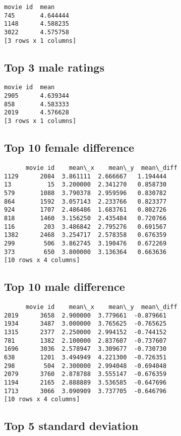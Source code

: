 \documentclass{article}
\begin{document}
\begin{verbatim}
movie id  mean
745       4.644444
1148      4.588235
3022      4.575758
[3 rows x 1 columns]
\end{verbatim}

\subsection{Top 3 male ratings}

\begin{verbatim}
movie id  mean
2905      4.639344
858       4.583333
2019      4.576628
[3 rows x 1 columns]
\end{verbatim}

\subsection{Top 10 female difference}

\begin{verbatim}
      movie id    mean\_x    mean\_y  mean\_diff
1129      2084  3.861111  2.666667   1.194444
13          15  3.200000  2.341270   0.858730
579       1088  3.790378  2.959596   0.830782
864       1592  3.057143  2.233766   0.823377
924       1707  2.486486  1.683761   0.802726
818       1460  3.156250  2.435484   0.720766
116        203  3.486842  2.795276   0.691567
1382      2468  3.254717  2.578358   0.676359
299        506  3.862745  3.190476   0.672269
373        650  3.800000  3.136364   0.663636
[10 rows x 4 columns]
\end{verbatim}

\subsection{Top 10 male difference}

\begin{verbatim}
      movie id    mean\_x    mean\_y  mean\_diff
2019      3658  2.900000  3.779661  -0.879661
1934      3487  3.000000  3.765625  -0.765625
1315      2377  2.250000  2.994152  -0.744152
781       1382  2.100000  2.837607  -0.737607
1696      3036  2.578947  3.309677  -0.730730
638       1201  3.494949  4.221300  -0.726351
298        504  2.300000  2.994048  -0.694048
2079      3760  2.878788  3.555147  -0.676359
1194      2165  2.888889  3.536585  -0.647696
1713      3066  3.090909  3.737705  -0.646796
[10 rows x 4 columns]
\end{verbatim}

\subsection{Top 5 standard deviation}
\end{document}
